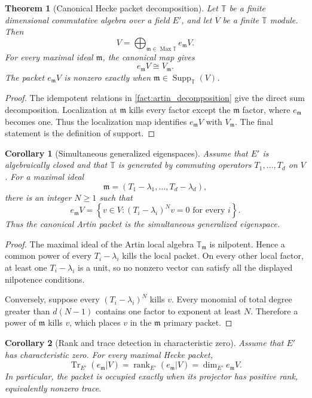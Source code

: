 \documentclass{aomart}
\newtheorem{theorem}{Theorem}[section]
\newtheorem{corollary}[corollary]{Corollary}
\theoremstyle{definition}
\theoremstyle{remark}
\newcommand{\TT}{\mathbb T}
\newcommand{\Supp}{\operatorname{Supp}}
\newcommand{\rank}{\operatorname{rank}}
\newcommand{\Tr}{\operatorname{Tr}}
\newcommand{\Max}{\operatorname{Max}}
\newcommand{\frakm}{\mathfrak m}
\begin{document}
\begin{theorem}[Canonical Hecke packet decomposition]\label{thm:canonical_hecke_packets}
Let \(\TT\) be a finite dimensional commutative algebra over a field \(E'\), and let \(V\) be a finite \(\TT\) module. Then
\[
\boxed{
V
=
\bigoplus_{\frakm\in\Max\TT}e_{\frakm}V.
}
\]
For every maximal ideal \(\frakm\), the canonical map gives
\[
\boxed{
e_{\frakm}V\cong V_{\frakm}.}
\]
The packet \(e_{\frakm}V\) is nonzero exactly when \(\frakm\in\Supp_{\TT}(V)\).
\end{theorem}

\begin{proof}
The idempotent relations in \cref{fact:artin_decomposition} give the direct sum decomposition. Localization at \(\frakm\) kills every factor except the \(\frakm\) factor, where \(e_{\frakm}\) becomes one. Thus the localization map identifies \(e_{\frakm}V\) with \(V_{\frakm}\). The final statement is the definition of support.
\end{proof}

\begin{corollary}[Simultaneous generalized eigenspaces]\label{cor:simultaneous_generalized_eigenspaces}
Assume that \(E'\) is algebraically closed and that \(\TT\) is generated by commuting operators \(T_1,\ldots,T_d\) on \(V\). For a maximal ideal
\[
\frakm
=
(T_1-\lambda_1,\ldots,T_d-\lambda_d),
\]
there is an integer \(N\geq1\) such that
\[
\boxed{
e_{\frakm}V
=
\left\{
v\in V:
(T_i-\lambda_i)^Nv=0
\text{ for every }i
\right\}.
}
\]
Thus the canonical Artin packet is the simultaneous generalized eigenspace.
\end{corollary}

\begin{proof}
The maximal ideal of the Artin local algebra \(\TT_{\frakm}\) is nilpotent. Hence a common power of every \(T_i-\lambda_i\) kills the local packet. On every other local factor, at least one \(T_i-\lambda_i\) is a unit, so no nonzero vector can satisfy all the displayed nilpotence conditions.

Conversely, suppose every \((T_i-\lambda_i)^N\) kills \(v\). Every monomial of total degree greater than \(d(N-1)\) contains one factor to exponent at least \(N\). Therefore a power of \(\frakm\) kills \(v\), which places \(v\) in the \(\frakm\) primary packet.
\end{proof}

\begin{corollary}[Rank and trace detection in characteristic zero]\label{cor:rank_trace_detection}
Assume that \(E'\) has characteristic zero. For every maximal Hecke packet,
\[
\boxed{
\Tr_{E'}(e_{\frakm}|V)
=
\rank_{E'}(e_{\frakm}|V)
=
\dim_{E'}e_{\frakm}V.
}
\]
In particular, the packet is occupied exactly when its projector has positive rank, equivalently nonzero trace.
\end{corollary}
\end{document}
